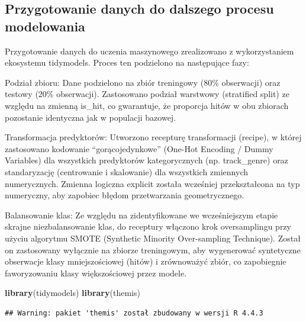 \documentclass[
]{article}
\newenvironment{Shaded}{\begin{snugshade}}{\end{snugshade}}
\newcommand{\FunctionTok}[1]{\textcolor[rgb]{0.13,0.29,0.53}{\textbf{#1}}}
\newcommand{\NormalTok}[1]{#1}
\begin{document}
\subsection{Przygotowanie danych do dalszego procesu
modelowania}\label{przygotowanie-danych-do-dalszego-procesu-modelowania}

Przygotowanie danych do uczenia maszynowego zrealizowano z
wykorzystaniem ekosystemu tidymodels. Proces ten podzielono na
następujące fazy:

Podział zbioru: Dane podzielono na zbiór treningowy (80\% obserwacji)
oraz testowy (20\% obserwacji). Zastosowano podział warstwowy
(stratified split) ze względu na zmienną is\_hit, co gwarantuje, że
proporcja hitów w obu zbiorach pozostanie identyczna jak w populacji
bazowej.

Transformacja predyktorów: Utworzono recepturę transformacji (recipe), w
której zastosowano kodowanie ``gorącojedynkowe'' (One-Hot Encoding /
Dummy Variables) dla wszystkich predyktorów kategorycznych (np.
track\_genre) oraz standaryzację (centrowanie i skalowanie) dla
wszystkich zmiennych numerycznych. Zmienna logiczna explicit została
wcześniej przekształcona na typ numeryczny, aby zapobiec błędom
przetwarzania geometrycznego.

Balansowanie klas: Ze względu na zidentyfikowane we wcześniejszym etapie
skrajne niezbalansowanie klas, do receptury włączono krok oversamplingu
przy użyciu algorytmu SMOTE (Synthetic Minority Over-sampling
Technique). Został on zastosowany wyłącznie na zbiorze treningowym, aby
wygenerować syntetyczne obserwacje klasy mniejszościowej (hitów) i
zrównoważyć zbiór, co zapobiegnie faworyzowaniu klasy większościowej
przez modele.

\begin{Shaded}
\begin{Highlighting}[]
\FunctionTok{library}\NormalTok{(tidymodels)}
\FunctionTok{library}\NormalTok{(themis)}
\end{Highlighting}
\end{Shaded}

\begin{verbatim}
## Warning: pakiet 'themis' został zbudowany w wersji R 4.4.3
\end{verbatim}
\end{document}
